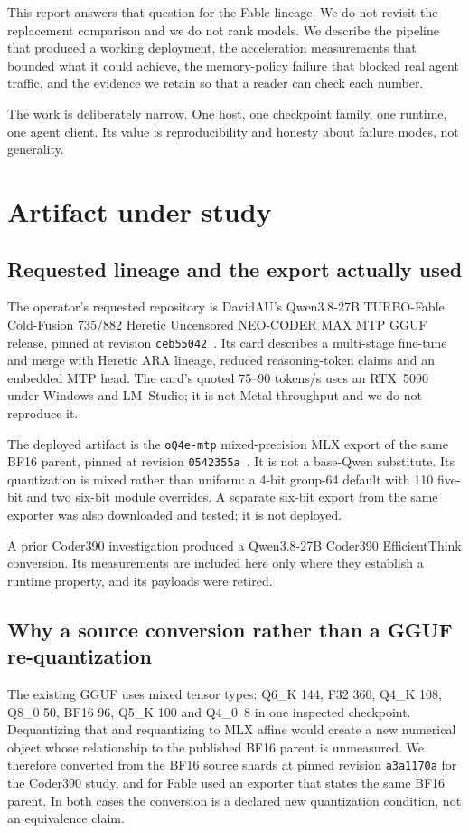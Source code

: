 \documentclass[11pt]{article}
\begin{document}
This report answers that question for the Fable lineage. We do not revisit the replacement comparison and we do not rank models. We describe the pipeline that produced a working deployment, the acceleration measurements that bounded what it could achieve, the memory-policy failure that blocked real agent traffic, and the evidence we retain so that a reader can check each number.

The work is deliberately narrow. One host, one checkpoint family, one runtime, one agent client. Its value is reproducibility and honesty about failure modes, not generality.

\section{Artifact under study}
\subsection{Requested lineage and the export actually used}
The operator's requested repository is DavidAU's Qwen3.8-27B TURBO-Fable Cold-Fusion 735/882 Heretic Uncensored NEO-CODER MAX MTP GGUF release, pinned at revision \texttt{ceb55042}~\cite{fable}. Its card describes a multi-stage fine-tune and merge with Heretic ARA lineage, reduced reasoning-token claims and an embedded MTP head. The card's quoted 75--90 tokens/s uses an RTX~5090 under Windows and LM~Studio; it is not Metal throughput and we do not reproduce it.

The deployed artifact is the \texttt{oQ4e-mtp} mixed-precision MLX export of the same BF16 parent, pinned at revision \texttt{0542355a}~\cite{oq4}. It is not a base-Qwen substitute. Its quantization is mixed rather than uniform: a 4-bit group-64 default with 110 five-bit and two six-bit module overrides. A separate six-bit export from the same exporter was also downloaded and tested; it is not deployed.

A prior Coder390 investigation produced a Qwen3.8-27B Coder390 EfficientThink conversion. Its measurements are included here only where they establish a runtime property, and its payloads were retired.

\subsection{Why a source conversion rather than a GGUF re-quantization}
The existing GGUF uses mixed tensor types: Q6\_K 144, F32 360, Q4\_K 108, Q8\_0 50, BF16 96, Q5\_K 100 and Q4\_0~8 in one inspected checkpoint. Dequantizing that and requantizing to MLX affine would create a new numerical object whose relationship to the published BF16 parent is unmeasured. We therefore converted from the BF16 source shards at pinned revision \texttt{a3a1170a} for the Coder390 study, and for Fable used an exporter that states the same BF16 parent. In both cases the conversion is a declared new quantization condition, not an equivalence claim.
\end{document}
